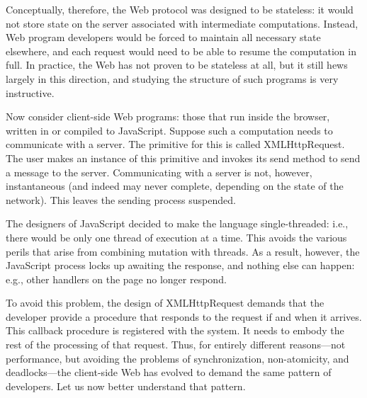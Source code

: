 Conceptually, therefore, the Web protocol was designed to be stateless: it would
not store state on the server associated with intermediate computations.
Instead, Web program developers would be forced to maintain all necessary state
elsewhere, and each request would need to be able to resume the computation in
full. In practice, the Web has not proven to be stateless at all, but it still
hews largely in this direction, and studying the structure of such programs is
very instructive.

Now consider client-side Web programs: those that run inside the browser,
written in or compiled to JavaScript. Suppose such a computation needs to
communicate with a server. The primitive for this is called XMLHttpRequest. The
user makes an instance of this primitive and invokes its send method to send a
message to the server. Communicating with a server is not, however,
instantaneous (and indeed may never complete, depending on the state of the
network). This leaves the sending process suspended.

The designers of JavaScript decided to make the language single-threaded: i.e.,
there would be only one thread of execution at a time. This avoids the various
perils that arise from combining mutation with threads. As a result, however,
the JavaScript process locks up awaiting the response, and nothing else can
happen: e.g., other handlers on the page no longer respond.

To avoid this problem, the design of XMLHttpRequest demands that the developer
provide a procedure that responds to the request if and when it arrives. This
callback procedure is registered with the system. It needs to embody the rest of
the processing of that request. Thus, for entirely different reasons—not
performance, but avoiding the problems of synchronization, non-atomicity, and
deadlocks—the client-side Web has evolved to demand the same pattern of
developers. Let us now better understand that pattern.

\secdown




\secup
